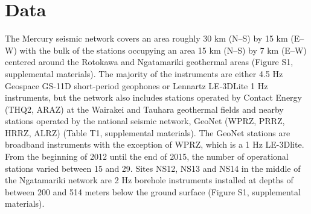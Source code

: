 \begin{table}
\centering
{}
\caption{{Table summarizing the injection operations presented here, all of which were undertaken prior to plant startup at Ngatamariki. The maximum pressures reported in the final column are for wellhead pressure (WHP), downhole pressure (DHP) or both where present. Q denotes flow rate in tons / hour.}}
\label{table:operations}
\end{table}

\section{Data} \label{Data}
The Mercury seismic network covers an area roughly 30 km (N--S) by 15 km (E--W) with the bulk of the stations occupying an area 15 km (N--S) by 7 km (E--W) centered around the Rotokawa and Ngatamariki geothermal areas (Figure S1, supplemental materials). The majority of the instruments are either 4.5 Hz Geospace GS-11D short-period geophones or Lennartz LE-3DLite 1 Hz instruments, but the network also includes stations operated by Contact Energy (THQ2, ARAZ) at the Wairakei and Tauhara geothermal fields and nearby stations operated by the national seismic network, GeoNet (WPRZ, PRRZ, HRRZ, ALRZ) (Table T1, supplemental materials). The GeoNet stations are broadband instruments with the exception of WPRZ, which is a 1 Hz LE-3Dlite. From the beginning of 2012 until the end of 2015, the number of operational stations varied between 15 and 29. Sites NS12, NS13 and NS14 in the middle of the Ngatamariki network are 2 Hz borehole instruments installed at depths of between 200 and 514 meters below the ground surface (Figure S1, supplemental materials).

